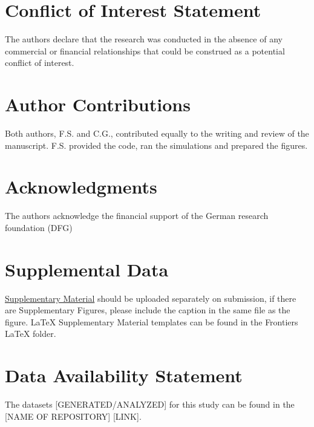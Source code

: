 \documentclass[utf8]{frontiersSCNS} %
\begin{document}
\section*{Conflict of Interest Statement}

The authors declare that the research was conducted in the absence of any commercial or financial relationships that could be construed as a potential conflict of interest.

\section*{Author Contributions}

Both authors, F.S. and C.G., contributed equally to the
writing and review of the manuscript. F.S. provided the code,
ran the simulations and prepared the figures.


\section*{Acknowledgments}

The authors acknowledge the financial support of
the German research foundation (DFG)
\section*{Supplemental Data}
 \href{http://home.frontiersin.org/about/author-guidelines#SupplementaryMaterial}{Supplementary Material} 
 should be uploaded separately on submission, if there are Supplementary Figures, 
 please include the caption in the same file as the figure. LaTeX Supplementary Material templates can be found in the Frontiers LaTeX folder.

\section*{Data Availability Statement}
The datasets [GENERATED/ANALYZED] for this study can be found in the [NAME OF REPOSITORY] [LINK].
\end{document}
